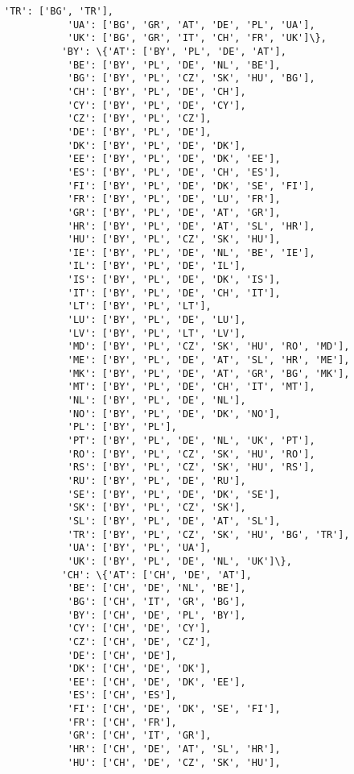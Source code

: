\documentclass[11pt]{article}
\begin{document}
\begin{Verbatim}[commandchars=\\\{\}]
           'TR': ['BG', 'TR'],
           'UA': ['BG', 'GR', 'AT', 'DE', 'PL', 'UA'],
           'UK': ['BG', 'GR', 'IT', 'CH', 'FR', 'UK']\},
          'BY': \{'AT': ['BY', 'PL', 'DE', 'AT'],
           'BE': ['BY', 'PL', 'DE', 'NL', 'BE'],
           'BG': ['BY', 'PL', 'CZ', 'SK', 'HU', 'BG'],
           'CH': ['BY', 'PL', 'DE', 'CH'],
           'CY': ['BY', 'PL', 'DE', 'CY'],
           'CZ': ['BY', 'PL', 'CZ'],
           'DE': ['BY', 'PL', 'DE'],
           'DK': ['BY', 'PL', 'DE', 'DK'],
           'EE': ['BY', 'PL', 'DE', 'DK', 'EE'],
           'ES': ['BY', 'PL', 'DE', 'CH', 'ES'],
           'FI': ['BY', 'PL', 'DE', 'DK', 'SE', 'FI'],
           'FR': ['BY', 'PL', 'DE', 'LU', 'FR'],
           'GR': ['BY', 'PL', 'DE', 'AT', 'GR'],
           'HR': ['BY', 'PL', 'DE', 'AT', 'SL', 'HR'],
           'HU': ['BY', 'PL', 'CZ', 'SK', 'HU'],
           'IE': ['BY', 'PL', 'DE', 'NL', 'BE', 'IE'],
           'IL': ['BY', 'PL', 'DE', 'IL'],
           'IS': ['BY', 'PL', 'DE', 'DK', 'IS'],
           'IT': ['BY', 'PL', 'DE', 'CH', 'IT'],
           'LT': ['BY', 'PL', 'LT'],
           'LU': ['BY', 'PL', 'DE', 'LU'],
           'LV': ['BY', 'PL', 'LT', 'LV'],
           'MD': ['BY', 'PL', 'CZ', 'SK', 'HU', 'RO', 'MD'],
           'ME': ['BY', 'PL', 'DE', 'AT', 'SL', 'HR', 'ME'],
           'MK': ['BY', 'PL', 'DE', 'AT', 'GR', 'BG', 'MK'],
           'MT': ['BY', 'PL', 'DE', 'CH', 'IT', 'MT'],
           'NL': ['BY', 'PL', 'DE', 'NL'],
           'NO': ['BY', 'PL', 'DE', 'DK', 'NO'],
           'PL': ['BY', 'PL'],
           'PT': ['BY', 'PL', 'DE', 'NL', 'UK', 'PT'],
           'RO': ['BY', 'PL', 'CZ', 'SK', 'HU', 'RO'],
           'RS': ['BY', 'PL', 'CZ', 'SK', 'HU', 'RS'],
           'RU': ['BY', 'PL', 'DE', 'RU'],
           'SE': ['BY', 'PL', 'DE', 'DK', 'SE'],
           'SK': ['BY', 'PL', 'CZ', 'SK'],
           'SL': ['BY', 'PL', 'DE', 'AT', 'SL'],
           'TR': ['BY', 'PL', 'CZ', 'SK', 'HU', 'BG', 'TR'],
           'UA': ['BY', 'PL', 'UA'],
           'UK': ['BY', 'PL', 'DE', 'NL', 'UK']\},
          'CH': \{'AT': ['CH', 'DE', 'AT'],
           'BE': ['CH', 'DE', 'NL', 'BE'],
           'BG': ['CH', 'IT', 'GR', 'BG'],
           'BY': ['CH', 'DE', 'PL', 'BY'],
           'CY': ['CH', 'DE', 'CY'],
           'CZ': ['CH', 'DE', 'CZ'],
           'DE': ['CH', 'DE'],
           'DK': ['CH', 'DE', 'DK'],
           'EE': ['CH', 'DE', 'DK', 'EE'],
           'ES': ['CH', 'ES'],
           'FI': ['CH', 'DE', 'DK', 'SE', 'FI'],
           'FR': ['CH', 'FR'],
           'GR': ['CH', 'IT', 'GR'],
           'HR': ['CH', 'DE', 'AT', 'SL', 'HR'],
           'HU': ['CH', 'DE', 'CZ', 'SK', 'HU'],

\end{Verbatim}
\end{document}
